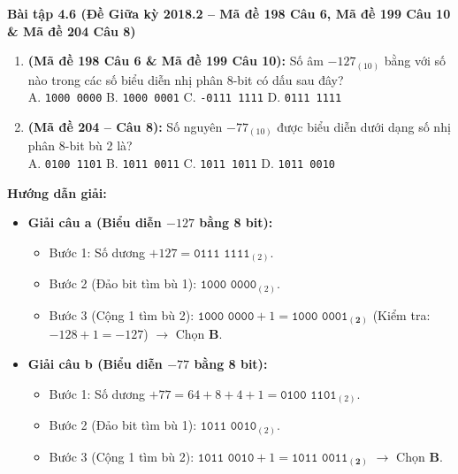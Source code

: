 \textbf{Bài tập 4.6 (Đề Giữa kỳ 2018.2 -- Mã đề 198 Câu 6, Mã đề 199 Câu 10 \& Mã đề 204 Câu 8)}
\begin{enumerate}[label=\alph*)]
    \item \textbf{(Mã đề 198 Câu 6 \& Mã đề 199 Câu 10):} Số âm $-127_{(10)}$ bằng với số nào trong các số biểu diễn nhị phân 8-bit có dấu sau đây?\\
    A. \texttt{1000 0000} \qquad B. \texttt{1000 0001} \qquad C. \texttt{-0111 1111} \qquad D. \texttt{0111 1111}
    \item \textbf{(Mã đề 204 -- Câu 8):} Số nguyên $-77_{(10)}$ được biểu diễn dưới dạng số nhị phân 8-bit bù 2 là?\\
    A. \texttt{0100 1101} \qquad B. \texttt{1011 0011} \qquad C. \texttt{1011 1011} \qquad D. \texttt{1011 0010}
\end{enumerate}
\textbf{Hướng dẫn giải:}
\begin{itemize}
    \item \textbf{Giải câu a (Biểu diễn $-127$ bằng 8 bit):}
    \begin{itemize}
        \item Bước 1: Số dương $+127 = \texttt{0111 1111}_{(2)}$.
        \item Bước 2 (Đảo bit tìm bù 1): $\texttt{1000 0000}_{(2)}$.
        \item Bước 3 (Cộng 1 tìm bù 2): $\texttt{1000 0000} + 1 = \mathbf{\texttt{1000 0001}_{(2)}}$ (Kiểm tra: $-128 + 1 = -127$) $\rightarrow$ Chọn \textbf{B}.
    \end{itemize}
    \item \textbf{Giải câu b (Biểu diễn $-77$ bằng 8 bit):}
    \begin{itemize}
        \item Bước 1: Số dương $+77 = 64 + 8 + 4 + 1 = \texttt{0100 1101}_{(2)}$.
        \item Bước 2 (Đảo bit tìm bù 1): $\texttt{1011 0010}_{(2)}$.
        \item Bước 3 (Cộng 1 tìm bù 2): $\texttt{1011 0010} + 1 = \mathbf{\texttt{1011 0011}_{(2)}}$ $\rightarrow$ Chọn \textbf{B}.
    \end{itemize}
\end{itemize}

